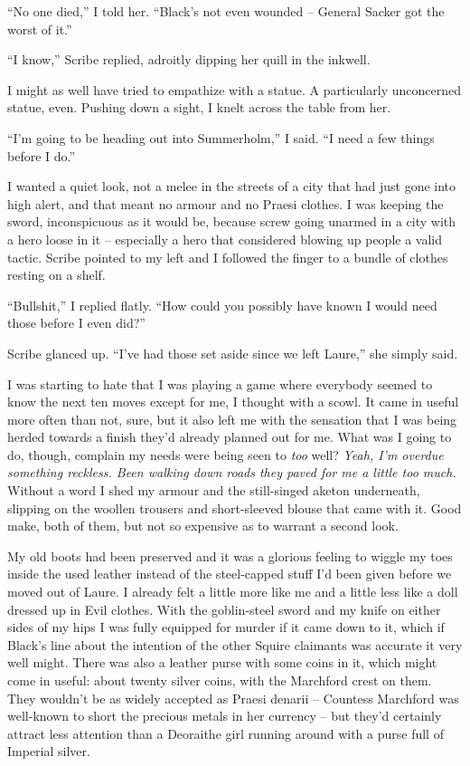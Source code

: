 \documentclass[12pt, openany]{book}
\begin{document}
“No one died,” I told her. “Black’s not even wounded – General Sacker got the worst of it.”

“I know,” Scribe replied, adroitly dipping her quill in the inkwell.

I might as well have tried to empathize with a statue. A particularly unconcerned statue, even. Pushing down a sight, I knelt across the table from her.

“I’m going to be heading out into Summerholm,” I said. “I need a few things before I do.”

I wanted a quiet look, not a melee in the streets of a city that had just gone into high alert, and that meant no armour and no Praesi clothes. I was keeping the sword, inconspicuous as it would be, because screw going unarmed in a city with a hero loose in it – especially a hero that considered blowing up people a valid tactic. Scribe pointed to my left and I followed the finger to a bundle of clothes resting on a shelf. 

“Bullshit,” I replied flatly. “How could you possibly have known I would need those before I even did?”

Scribe glanced up. “I’ve had those set aside since we left Laure,” she simply said.

I was starting to hate that I was playing a game where everybody seemed to know the next ten moves except for me, I thought with a scowl. It came in useful more often than not, sure, but it also left me with the sensation that I was being herded towards a finish they’d already planned out for me. What was I going to do, though, complain my needs were being seen to \textit{too} well? \textit{Yeah, I’m overdue something reckless. Been walking down roads they paved for me a little too much.} Without a word I shed my armour and the still-singed aketon underneath, slipping on the woollen trousers and short-sleeved blouse that came with it. Good make, both of them, but not so expensive as to warrant a second look.

My old boots had been preserved and it was a glorious feeling to wiggle my toes inside the used leather instead of the steel-capped stuff I’d been given before we moved out of Laure. I already felt a little more like me and a little less like a doll dressed up in Evil clothes. With the goblin-steel sword and my knife on either sides of my hips I was fully equipped for murder if it came down to it, which if Black’s line about the intention of the other Squire claimants was accurate it very well might. There was also a leather purse with some coins in it, which might come in useful: about twenty silver coins, with the Marchford crest on them. They wouldn’t be as widely accepted as Praesi denarii – Countess Marchford was well-known to short the precious metals in her currency – but they’d certainly attract less attention than a Deoraithe girl running around with a purse full of Imperial silver.
\end{document}
